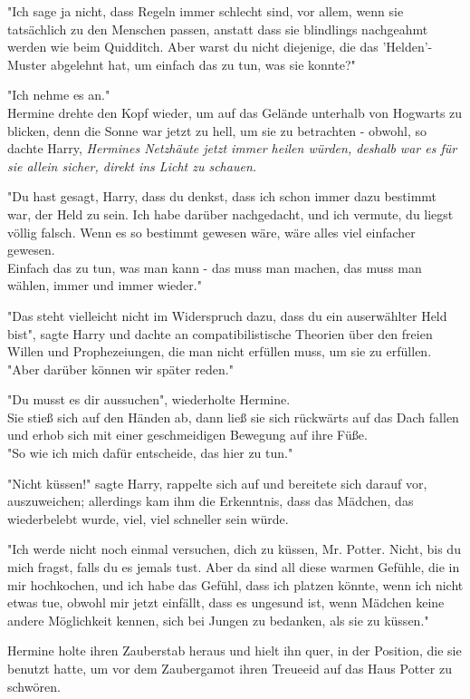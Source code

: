 {"Ich sage ja nicht, dass Regeln immer schlecht sind, vor allem, wenn sie tatsächlich zu den Menschen passen, anstatt dass sie blindlings nachgeahmt werden wie beim Quidditch. Aber warst du nicht diejenige, die das 'Helden'-Muster abgelehnt hat, um einfach das zu tun, was sie konnte?"

"Ich nehme es an."\\ Hermine drehte den Kopf wieder, um auf das Gelände unterhalb von Hogwarts zu blicken, denn die Sonne war jetzt zu hell, um sie zu betrachten - obwohl, so dachte Harry, \emph{Hermines Netzhäute jetzt immer heilen würden, deshalb war es für sie allein sicher, direkt ins Licht zu schauen.}

"Du hast gesagt, Harry, dass du denkst, dass ich schon immer dazu bestimmt war, der Held zu sein. Ich habe darüber nachgedacht, und ich vermute, du liegst völlig falsch. Wenn es so bestimmt gewesen wäre, wäre alles viel einfacher gewesen.\\ Einfach das zu tun, was man kann - das muss man machen, das muss man wählen, immer und immer wieder."

"Das steht vielleicht nicht im Widerspruch dazu, dass du ein auserwählter Held bist", sagte Harry und dachte an compatibilistische Theorien über den freien Willen und Prophezeiungen, die man nicht erfüllen muss, um sie zu erfüllen.\\ "Aber darüber können wir später reden."

"Du musst es dir aussuchen", wiederholte Hermine.\\ Sie stieß sich auf den Händen ab, dann ließ sie sich rückwärts auf das Dach fallen und erhob sich mit einer geschmeidigen Bewegung auf ihre Füße.\\ "So wie ich mich dafür entscheide, das hier zu tun."

"Nicht küssen!" sagte Harry, rappelte sich auf und bereitete sich darauf vor, auszuweichen; allerdings kam ihm die Erkenntnis, dass das Mädchen, das wiederbelebt wurde, viel, viel schneller sein würde.

"Ich werde nicht noch einmal versuchen, dich zu küssen, Mr. Potter. Nicht, bis du mich fragst, falls du es jemals tust. Aber da sind all diese warmen Gefühle, die in mir hochkochen, und ich habe das Gefühl, dass ich platzen könnte, wenn ich nicht etwas tue, obwohl mir jetzt einfällt, dass es ungesund ist, wenn Mädchen keine andere Möglichkeit kennen, sich bei Jungen zu bedanken, als sie zu küssen."

Hermine holte ihren Zauberstab heraus und hielt ihn quer, in der Position, die sie benutzt hatte, um vor dem Zaubergamot ihren Treueeid auf das Haus Potter zu schwören.

}
